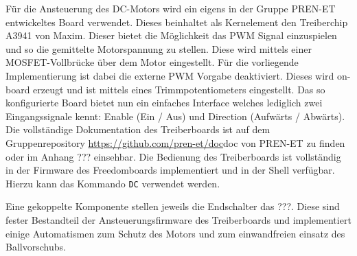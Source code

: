 Für die Ansteuerung des DC-Motors wird ein eigens in der Gruppe
PREN-ET entwickeltes Board verwendet. Dieses beinhaltet als
Kernelement den Treiberchip A3941 von Maxim. Dieser bietet die
Möglichkeit das PWM Signal einzuspielen und so die gemittelte
Motorspannung zu stellen. Diese wird mittels einer
MOSFET-Vollbrücke über dem Motor eingestellt. Für die vorliegende
Implementierung ist dabei die externe PWM Vorgabe deaktiviert.
Dieses wird on-board erzeugt und ist mittels eines
Trimmpotentiometers eingestellt. Das so konfigurierte Board
bietet nun ein einfaches Interface welches lediglich zwei
Eingangssignale kennt: Enable (Ein / Aus) und Direction (Aufwärts
/ Abwärts).
%
%
Die vollständige Dokumentation des Treiberboards ist auf dem
Gruppenrepository \url{https://github.com/pren-et/doc}{doc}
von PREN-ET zu finden oder im Anhang ??? einsehbar. Die Bedienung
des Treiberboards ist vollständig in der Firmware des
Freedomboards implementiert und in der Shell verfügbar. Hierzu kann
das Kommando \verb!DC! verwendet werden.

Eine gekoppelte Komponente stellen jeweils die Endschalter das
???. Diese sind fester Bestandteil der Ansteuerungsfirmware des
Treiberboards und implementiert einige Automatismen zum Schutz
des Motors und zum einwandfreien einsatz des Ballvorschubs.

